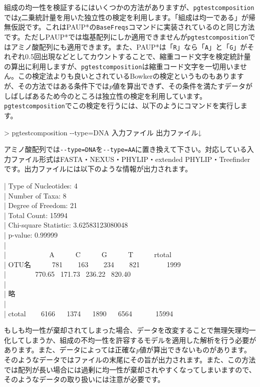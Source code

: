 \documentclass[titlepage,10pt,a4paper]{jsbook}
\newenvironment{content}{\begin{shaded}\vspace{-1em}\raggedright\ttfamily\footnotesize\setlength{\baselineskip}{1.4em}}{\end{shaded}\vspace{-1em}}
\newenvironment{cmd}{\begin{oframed}\raggedright\ttfamily\footnotesize\setlength{\baselineskip}{1.4em}}{\end{oframed}\vspace{-1em}}
\begin{document}
組成の均一性を検証するにはいくつかの方法がありますが、\texttt{pgtestcomposition}ではχ二乗統計量を用いた独立性の検定を利用します。「組成は均一である」が帰無仮説です。これはPAUP*\citep{Swofford2003}の\texttt{BaseFreqs}コマンドに実装されているのと同じ方法です。ただしPAUP*では塩基配列にしか適用できませんが\texttt{pgtestcomposition}ではアミノ酸配列にも適用できます。また、PAUP*は「\texttt{R}」なら「\texttt{A}」と「\texttt{G}」がそれぞれ0.5回出現などとしてカウントすることで、縮重コード文字を検定統計量の算出に利用しますが、\texttt{pgtestcomposition}は縮重コード文字を一切用いません。この検定法よりも良いとされているBowkerの検定というものもあります\citep{Ababneh2006}が、その方法ではある条件下では\textit{p}値を算出できず、その条件を満たすデータがしばしばあるため今のところは独立性の検定を利用しています。\texttt{pgtestcomposition}でこの検定を行うには、以下のようにコマンドを実行します。
\begin{cmd}
{\textgreater} pgtestcomposition {-}{-}type=DNA 入力ファイル 出力ファイル↓
\end{cmd}
アミノ酸配列では\texttt{{-}{-}type=DNA}を\texttt{{-}{-}type=AA}に置き換えて下さい。対応している入力ファイル形式はFASTA・NEXUS・PHYLIP・extended PHYLIP・Treefinderです。出力ファイルには以下のような情報が出力されます。
\begin{content}
| Type of Nucleotides: 4\\
| Number of Taxa: 8\\
| Degree of Freedom: 21\\
| Total Count: 15994\\
| Chi-square Statistic: 3.62583123080048\\
| p-value: 0.99999\\
| ~\\
| ~ ~ ~ ~ ~ ~ ~ A~ ~ ~ ~C~ ~ ~ ~G~ ~ ~ ~T~ ~ ~ ~rtotal\\
| OTU名~ ~ ~ ~781~ ~ ~163~ ~ ~234~ ~ ~821~ ~ ~ ~ ~1999\\
| ~ ~ ~ ~ ~770.65~ 171.73~ 236.22~ 820.40\\
| ~\\
| 略\\
| ~\\
| ctotal~ ~ ~6166~ ~ 1374~ ~ 1890~ ~ 6564~ ~ ~ ~ 15994
\end{content}
もしも均一性が棄却されてしまった場合、データを改変することで無理矢理均一化してしまうか、組成の不均一性を許容するモデル\citep{Blanquart2006,Blanquart2008}を適用した解析を行う必要があります。また、データによっては正確な\textit{p}値が算出できないものがあります\citep{Cochran1954}。そのようなデータではファイルの末尾にその旨が出力されます。また、この方法では配列が長い場合には過剰に均一性が棄却されやすくなってしまいますので、そのようなデータの取り扱いには注意が必要です。
\end{document}
